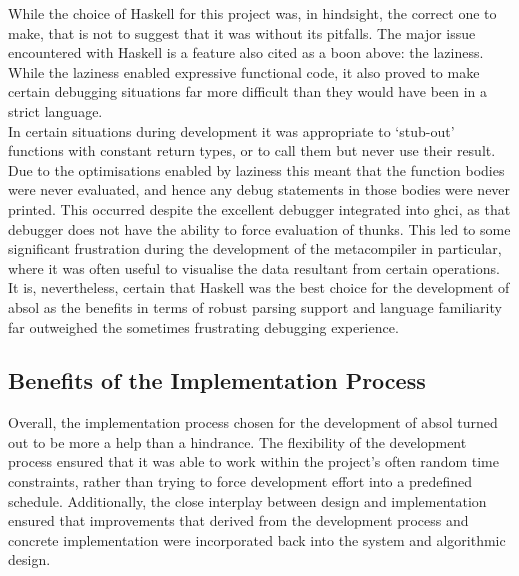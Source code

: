 While the choice of Haskell for this project was, in hindsight, the correct one to make, that is not to suggest that it was without its pitfalls.
The major issue encountered with Haskell is a feature also cited as a boon above: the laziness. 
While the laziness enabled expressive functional code, it also proved to make certain debugging situations far more difficult than they would have been in a strict language.\\

In certain situations during development it was appropriate to `stub-out' functions with constant return types, or to call them but never use their result.
Due to the optimisations enabled by laziness this meant that the function bodies were never evaluated, and hence any debug statements in those bodies were never printed. 
This occurred despite the excellent debugger integrated into \gls{ghci}, as that debugger does not have the ability to force evaluation of thunks.
This led to some significant frustration during the development of the metacompiler in particular, where it was often useful to visualise the data resultant from certain operations. \\

It is, nevertheless, certain that Haskell was the best choice for the development of \gls{absol} as the benefits in terms of robust parsing support and language familiarity far outweighed the sometimes frustrating debugging experience. 



\subsection{Benefits of the Implementation Process} %
\label{sub:benefits_of_the_implementation_process}
Overall, the implementation process chosen for the development of \gls{absol} turned out to be more a help than a hindrance. 
The flexibility of the development process ensured that it was able to work within the project's often random time constraints, rather than trying to force development effort into a predefined schedule.
Additionally, the close interplay between design and implementation ensured that improvements that derived from the development process and concrete implementation were incorporated back into the system and algorithmic design. \\

